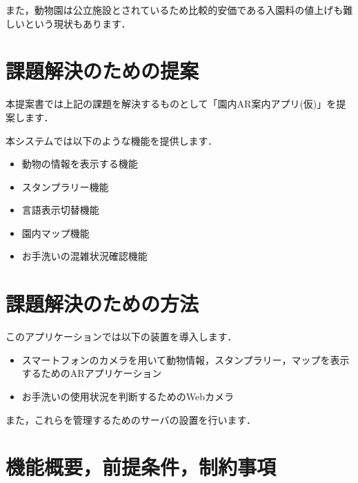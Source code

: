 \documentclass[a4j]{jarticle}
\begin{document}
また，動物園は公立施設とされているため比較的安価である入園料の値上げも難しいという現状もあります．


\section{課題解決のための提案}
本提案書では上記の課題を解決するものとして「園内AR案内アプリ(仮)」を提案します．

本システムでは以下のような機能を提供します．

\begin{itemize}
	\item 動物の情報を表示する機能
	\item スタンプラリー機能
	\item 言語表示切替機能
	\item 園内マップ機能
	\item お手洗いの混雑状況確認機能
\end{itemize}


\section{課題解決のための方法}
このアプリケーションでは以下の装置を導入します．

\begin{itemize}
	\item スマートフォンのカメラを用いて動物情報，スタンプラリー，マップを表示するためのARアプリケーション
	\item お手洗いの使用状況を判断するためのWebカメラ
\end{itemize}

また，これらを管理するためのサーバの設置を行います．


\section{機能概要，前提条件，制約事項}
\end{document}
